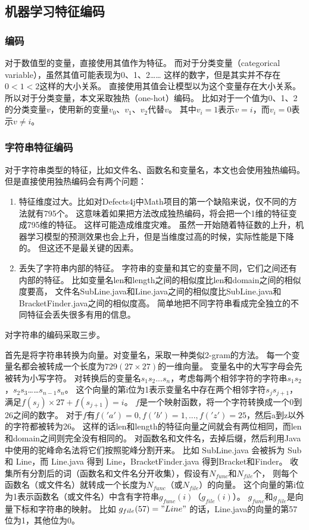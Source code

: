 \subsection{机器学习特征编码}

\subsubsection{编码}

对于数值型的变量，直接使用其值作为特征。
而对于分类变量（categorical variable），虽然其值可能表现为0、1、2……
这样的数字，但是其实并不存在$0 < 1 < 2$这样的大小关系。
直接使用其值会让模型以为这个变量存在大小关系。
所以对于分类变量，本文采取独热（one-hot）编码。
比如对于一个值为0、1、2的分类变量$v$，使用新的变量$v_0$、$v_1$、$v_2$代替$v$。
其中$v_i = 1$表示$v = i$，而$v_i = 0$表示$v \ne i$。

\subsubsection{字符串特征编码}

对于字符串类型的特征，比如文件名、函数名和变量名，本文也会使用独热编码。
但是直接使用独热编码会有两个问题：
\begin{enumerate}
\item 特征维度过大。比如对Defects4j中Math项目的第一个缺陷来说，仅不同的方法就有795个。
这意味着如果把方法改成独热编码，将会把一个1维的特征变成795维的特征。
这样可能造成维度灾难\parencite{Richard1957Dynamic}。
虽然一开始随着特征数的上升，机器学习模型的预测效果也会上升，但是当维度过高的时候，实际性能是下降的。
但这还不是最关键的因素。
\item 丢失了字符串内部的特征。
字符串的变量和其它的变量不同，它们之间还有内部的特征。
比如变量名len和length之间的相似度比len和domain之间的相似度要高，
文件名SubLine.java和Line.java之间的相似度比SubLine.java和BracketFinder.java之间的相似度高。
简单地把不同字符串看成完全独立的不同特征会丢失很多有用的信息。
\end{enumerate}

对字符串的编码采取三步。

首先是将字符串转换为向量。对变量名，采取一种类似2-gram的方法。
每一个变量名都会被转成一个长度为$729 (27 \times 27)$的一维向量。
变量名中的大写字母会先被转为小写字符。
对转换后的变量名$s_1s_2...s_n$，考虑每两个相邻字符的字符串$s_1s_2$，$s_2s_3$……$s_{n - 1}s_n$。
这个向量的第i位为1表示变量名中存在两个相邻字符$s_js_{j+1}$，满足$f(s_j) \times 27 + f(s_{j + 1}) = i$。
$f$是一个映射函数，将一个字符转换成一个0到26之间的数字。
对于$f$有$f('a') = 0, f('b') = 1, ..., f('z') = 25$，然后a到z以外的字符都被转为26。
这样的话len和length的特征向量之间就会有两位相同，而len和domain之间则完全没有相同的。
对函数名和文件名，去掉后缀，然后利用Java中使用的驼峰命名法将它们按照驼峰分割开来。
比如 SubLine.java 会被拆为 Sub 和 Line，而 Line.java 得到 Line，BracketFinder.java 得到Bracket和Finder。
收集所有分割后的词（函数名和文件名分开收集），假设有$N_{func}$和$N_{file}$个，
则每个函数名（或文件名）就转成一个长度为$N_{func}$（或$N_{file}$）的向量。
这个向量的第i位为1表示函数名（或文件名）中含有字符串$g_{func}(i)$（$g_{file}(i)$）。
$g_{func}$和$g_{file}$是向量下标和字符串的映射。
比如 $g_{file}(57) = "Line"$ 的话，Line.java的向量的第57位为1，其他位为0。


